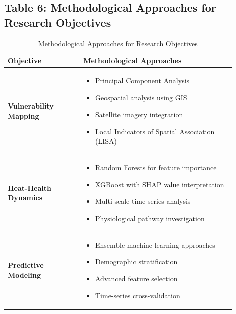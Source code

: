 \documentclass[12pt,a4paper,landscape]{article}
\begin{document}
\subsection*{Table 6: Methodological Approaches for Research Objectives}
\begin{table}[H]
\centering
\caption{Methodological Approaches for Research Objectives}
\label{tab:research_objectives}
\begin{tabular}{L{0.3\linewidth}L{0.6\linewidth}}
\toprule
\textbf{Objective} & \textbf{Methodological Approaches} \\
\midrule
\textbf{Vulnerability Mapping} & 
\begin{itemize}[leftmargin=*]
    \item Principal Component Analysis
    \item Geospatial analysis using GIS
    \item Satellite imagery integration
    \item Local Indicators of Spatial Association (LISA)
\end{itemize} \\
\midrule
\textbf{Heat-Health Dynamics} & 
\begin{itemize}[leftmargin=*]
    \item Random Forests for feature importance
    \item XGBoost with SHAP value interpretation
    \item Multi-scale time-series analysis
    \item Physiological pathway investigation
\end{itemize} \\
\midrule
\textbf{Predictive Modeling} & 
\begin{itemize}[leftmargin=*]
    \item Ensemble machine learning approaches
    \item Demographic stratification
    \item Advanced feature selection
    \item Time-series cross-validation
\end{itemize} \\
\bottomrule
\end{tabular}
\end{table}

\end{document}
